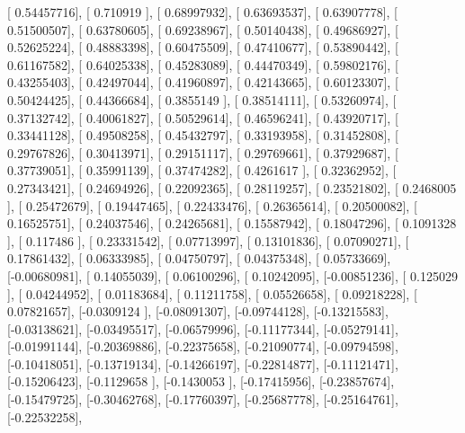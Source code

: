 \documentclass{article}
\begin{document}
       [ 0.54457716],
       [ 0.710919  ],
       [ 0.68997932],
       [ 0.63693537],
       [ 0.63907778],
       [ 0.51500507],
       [ 0.63780605],
       [ 0.69238967],
       [ 0.50140438],
       [ 0.49686927],
       [ 0.52625224],
       [ 0.48883398],
       [ 0.60475509],
       [ 0.47410677],
       [ 0.53890442],
       [ 0.61167582],
       [ 0.64025338],
       [ 0.45283089],
       [ 0.44470349],
       [ 0.59802176],
       [ 0.43255403],
       [ 0.42497044],
       [ 0.41960897],
       [ 0.42143665],
       [ 0.60123307],
       [ 0.50424425],
       [ 0.44366684],
       [ 0.3855149 ],
       [ 0.38514111],
       [ 0.53260974],
       [ 0.37132742],
       [ 0.40061827],
       [ 0.50529614],
       [ 0.46596241],
       [ 0.43920717],
       [ 0.33441128],
       [ 0.49508258],
       [ 0.45432797],
       [ 0.33193958],
       [ 0.31452808],
       [ 0.29767826],
       [ 0.30413971],
       [ 0.29151117],
       [ 0.29769661],
       [ 0.37929687],
       [ 0.37739051],
       [ 0.35991139],
       [ 0.37474282],
       [ 0.4261617 ],
       [ 0.32362952],
       [ 0.27343421],
       [ 0.24694926],
       [ 0.22092365],
       [ 0.28119257],
       [ 0.23521802],
       [ 0.2468005 ],
       [ 0.25472679],
       [ 0.19447465],
       [ 0.22433476],
       [ 0.26365614],
       [ 0.20500082],
       [ 0.16525751],
       [ 0.24037546],
       [ 0.24265681],
       [ 0.15587942],
       [ 0.18047296],
       [ 0.1091328 ],
       [ 0.117486  ],
       [ 0.23331542],
       [ 0.07713997],
       [ 0.13101836],
       [ 0.07090271],
       [ 0.17861432],
       [ 0.06333985],
       [ 0.04750797],
       [ 0.04375348],
       [ 0.05733669],
       [-0.00680981],
       [ 0.14055039],
       [ 0.06100296],
       [ 0.10242095],
       [-0.00851236],
       [ 0.125029  ],
       [ 0.04244952],
       [ 0.01183684],
       [ 0.11211758],
       [ 0.05526658],
       [ 0.09218228],
       [ 0.07821657],
       [-0.0309124 ],
       [-0.08091307],
       [-0.09744128],
       [-0.13215583],
       [-0.03138621],
       [-0.03495517],
       [-0.06579996],
       [-0.11177344],
       [-0.05279141],
       [-0.01991144],
       [-0.20369886],
       [-0.22375658],
       [-0.21090774],
       [-0.09794598],
       [-0.10418051],
       [-0.13719134],
       [-0.14266197],
       [-0.22814877],
       [-0.11121471],
       [-0.15206423],
       [-0.1129658 ],
       [-0.1430053 ],
       [-0.17415956],
       [-0.23857674],
       [-0.15479725],
       [-0.30462768],
       [-0.17760397],
       [-0.25687778],
       [-0.25164761],
       [-0.22532258],
\end{document}
